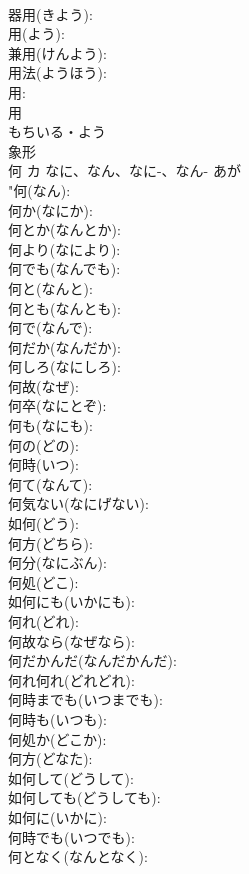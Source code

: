 \documentclass[8pt]{extreport}
\begin{document}
\begin{CJK}{UTF8}{min}
\\	器用(きよう): 
\\	用(よう): 
\\	兼用(けんよう): 
\\	用法(ようほう): 
\\	用: 
\\	用	
\\	もちいる・よう	
\\	象形 
\\	何	カ	なに、なん、なに-、なん-	あが	
\\	"何(なん): 
\\	何か(なにか): 
\\	何とか(なんとか): 
\\	何より(なにより): 
\\	何でも(なんでも): 
\\	何と(なんと): 
\\	何とも(なんとも): 
\\	何で(なんで): 
\\	何だか(なんだか): 
\\	何しろ(なにしろ): 
\\	何故(なぜ): 
\\	何卒(なにとぞ): 
\\	何も(なにも): 
\\	何の(どの): 
\\	何時(いつ): 
\\	何て(なんて): 
\\	何気ない(なにげない): 
\\	如何(どう): 
\\	何方(どちら): 
\\	何分(なにぶん): 
\\	何処(どこ): 
\\	如何にも(いかにも): 
\\	何れ(どれ): 
\\	何故なら(なぜなら): 
\\	何だかんだ(なんだかんだ): 
\\	何れ何れ(どれどれ): 
\\	何時までも(いつまでも): 
\\	何時も(いつも): 
\\	何処か(どこか): 
\\	何方(どなた): 
\\	如何して(どうして): 
\\	如何しても(どうしても): 
\\	如何に(いかに): 
\\	何時でも(いつでも): 
\\	何となく(なんとなく): 

\end{CJK}
\end{document}
